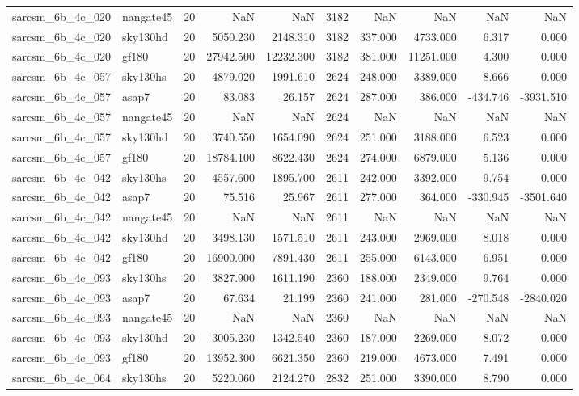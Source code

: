 \begin{longtable}{llrrrrrrrr}
sarcsm\_6b\_4c\_020 & nangate45 & 20 & NaN & NaN & 3182 & NaN & NaN & NaN & NaN \\
sarcsm\_6b\_4c\_020 & sky130hd & 20 & 5050.230 & 2148.310 & 3182 & 337.000 & 4733.000 & 6.317 & 0.000 \\
sarcsm\_6b\_4c\_020 & gf180 & 20 & 27942.500 & 12232.300 & 3182 & 381.000 & 11251.000 & 4.300 & 0.000 \\
sarcsm\_6b\_4c\_057 & sky130hs & 20 & 4879.020 & 1991.610 & 2624 & 248.000 & 3389.000 & 8.666 & 0.000 \\
sarcsm\_6b\_4c\_057 & asap7 & 20 & 83.083 & 26.157 & 2624 & 287.000 & 386.000 & -434.746 & -3931.510 \\
sarcsm\_6b\_4c\_057 & nangate45 & 20 & NaN & NaN & 2624 & NaN & NaN & NaN & NaN \\
sarcsm\_6b\_4c\_057 & sky130hd & 20 & 3740.550 & 1654.090 & 2624 & 251.000 & 3188.000 & 6.523 & 0.000 \\
sarcsm\_6b\_4c\_057 & gf180 & 20 & 18784.100 & 8622.430 & 2624 & 274.000 & 6879.000 & 5.136 & 0.000 \\
sarcsm\_6b\_4c\_042 & sky130hs & 20 & 4557.600 & 1895.700 & 2611 & 242.000 & 3392.000 & 9.754 & 0.000 \\
sarcsm\_6b\_4c\_042 & asap7 & 20 & 75.516 & 25.967 & 2611 & 277.000 & 364.000 & -330.945 & -3501.640 \\
sarcsm\_6b\_4c\_042 & nangate45 & 20 & NaN & NaN & 2611 & NaN & NaN & NaN & NaN \\
sarcsm\_6b\_4c\_042 & sky130hd & 20 & 3498.130 & 1571.510 & 2611 & 243.000 & 2969.000 & 8.018 & 0.000 \\
sarcsm\_6b\_4c\_042 & gf180 & 20 & 16900.000 & 7891.430 & 2611 & 255.000 & 6143.000 & 6.951 & 0.000 \\
sarcsm\_6b\_4c\_093 & sky130hs & 20 & 3827.900 & 1611.190 & 2360 & 188.000 & 2349.000 & 9.764 & 0.000 \\
sarcsm\_6b\_4c\_093 & asap7 & 20 & 67.634 & 21.199 & 2360 & 241.000 & 281.000 & -270.548 & -2840.020 \\
sarcsm\_6b\_4c\_093 & nangate45 & 20 & NaN & NaN & 2360 & NaN & NaN & NaN & NaN \\
sarcsm\_6b\_4c\_093 & sky130hd & 20 & 3005.230 & 1342.540 & 2360 & 187.000 & 2269.000 & 8.072 & 0.000 \\
sarcsm\_6b\_4c\_093 & gf180 & 20 & 13952.300 & 6621.350 & 2360 & 219.000 & 4673.000 & 7.491 & 0.000 \\
sarcsm\_6b\_4c\_064 & sky130hs & 20 & 5220.060 & 2124.270 & 2832 & 251.000 & 3390.000 & 8.790 & 0.000 \\

\end{longtable}
